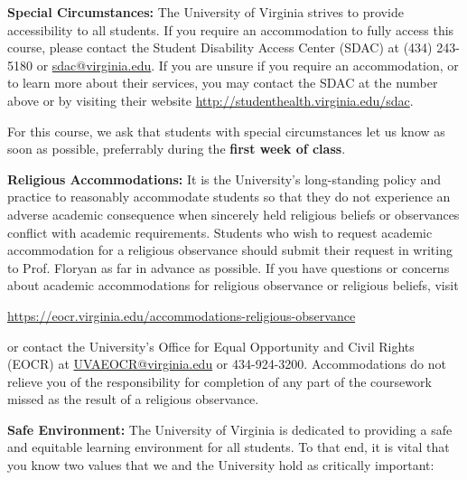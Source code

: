 \documentclass[12pt]{article}
\begin{document}

\textbf{Special Circumstances:} The University of Virginia strives to provide accessibility to all students. If you require an accommodation to fully access this course, please contact the Student Disability Access Center (SDAC) at (434) 243-5180 or \url{sdac@virginia.edu}. If you are unsure if you require an accommodation, or to learn more about their services, you may contact the SDAC at the number above or by visiting their website \url{http://studenthealth.virginia.edu/sdac}.

For this course, we ask that students with special circumstances let us know as soon as possible, preferrably during the \textbf{first week of class}.

\textbf{Religious Accommodations:} It is the University's long-standing policy and practice to reasonably accommodate students so that they do not experience an adverse academic consequence when sincerely held religious beliefs or observances conflict with academic requirements.  Students who wish to request academic accommodation for a religious observance should submit their request in writing to Prof. Floryan as far in advance as possible. If you have questions or concerns about academic accommodations for religious observance or religious beliefs, visit 

\begin{center} 
    \url{https://eocr.virginia.edu/accommodations-religious-observance}
\end{center}

or contact the University's Office for Equal Opportunity and Civil Rights (EOCR) at \url{UVAEOCR@virginia.edu} or 434-924-3200.  Accommodations do not relieve you of the responsibility for completion of any part of the coursework missed as the result of a religious observance.

\textbf{Safe Environment:} The University of Virginia is dedicated to providing a safe and equitable learning environment for all students. To that end, it is vital that you know two values that we and the University hold as critically important:
 
\end{document}
